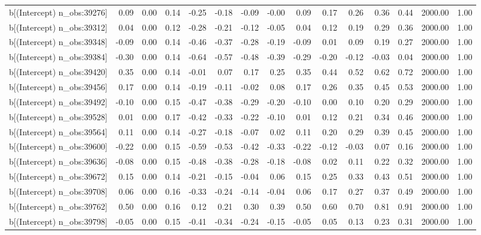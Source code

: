 \begin{table}[ht]
\begin{tabular}{rrrrrrrrrrrrrrr}
  b[(Intercept) n\_obs:39276] & 0.09 & 0.00 & 0.14 & -0.25 & -0.18 & -0.09 & -0.00 & 0.09 & 0.17 & 0.26 & 0.36 & 0.44 & 2000.00 & 1.00 \\ 
  b[(Intercept) n\_obs:39312] & 0.04 & 0.00 & 0.12 & -0.28 & -0.21 & -0.12 & -0.05 & 0.04 & 0.12 & 0.19 & 0.29 & 0.36 & 2000.00 & 1.00 \\ 
  b[(Intercept) n\_obs:39348] & -0.09 & 0.00 & 0.14 & -0.46 & -0.37 & -0.28 & -0.19 & -0.09 & 0.01 & 0.09 & 0.19 & 0.27 & 2000.00 & 1.00 \\ 
  b[(Intercept) n\_obs:39384] & -0.30 & 0.00 & 0.14 & -0.64 & -0.57 & -0.48 & -0.39 & -0.29 & -0.20 & -0.12 & -0.03 & 0.04 & 2000.00 & 1.00 \\ 
  b[(Intercept) n\_obs:39420] & 0.35 & 0.00 & 0.14 & -0.01 & 0.07 & 0.17 & 0.25 & 0.35 & 0.44 & 0.52 & 0.62 & 0.72 & 2000.00 & 1.00 \\ 
  b[(Intercept) n\_obs:39456] & 0.17 & 0.00 & 0.14 & -0.19 & -0.11 & -0.02 & 0.08 & 0.17 & 0.26 & 0.35 & 0.45 & 0.53 & 2000.00 & 1.00 \\ 
  b[(Intercept) n\_obs:39492] & -0.10 & 0.00 & 0.15 & -0.47 & -0.38 & -0.29 & -0.20 & -0.10 & 0.00 & 0.10 & 0.20 & 0.29 & 2000.00 & 1.00 \\ 
  b[(Intercept) n\_obs:39528] & 0.01 & 0.00 & 0.17 & -0.42 & -0.33 & -0.22 & -0.10 & 0.01 & 0.12 & 0.21 & 0.34 & 0.46 & 2000.00 & 1.00 \\ 
  b[(Intercept) n\_obs:39564] & 0.11 & 0.00 & 0.14 & -0.27 & -0.18 & -0.07 & 0.02 & 0.11 & 0.20 & 0.29 & 0.39 & 0.45 & 2000.00 & 1.00 \\ 
  b[(Intercept) n\_obs:39600] & -0.22 & 0.00 & 0.15 & -0.59 & -0.53 & -0.42 & -0.33 & -0.22 & -0.12 & -0.03 & 0.07 & 0.16 & 2000.00 & 1.00 \\ 
  b[(Intercept) n\_obs:39636] & -0.08 & 0.00 & 0.15 & -0.48 & -0.38 & -0.28 & -0.18 & -0.08 & 0.02 & 0.11 & 0.22 & 0.32 & 2000.00 & 1.00 \\ 
  b[(Intercept) n\_obs:39672] & 0.15 & 0.00 & 0.14 & -0.21 & -0.15 & -0.04 & 0.06 & 0.15 & 0.25 & 0.33 & 0.43 & 0.51 & 2000.00 & 1.00 \\ 
  b[(Intercept) n\_obs:39708] & 0.06 & 0.00 & 0.16 & -0.33 & -0.24 & -0.14 & -0.04 & 0.06 & 0.17 & 0.27 & 0.37 & 0.49 & 2000.00 & 1.00 \\ 
  b[(Intercept) n\_obs:39762] & 0.50 & 0.00 & 0.16 & 0.12 & 0.21 & 0.30 & 0.39 & 0.50 & 0.60 & 0.70 & 0.81 & 0.91 & 2000.00 & 1.00 \\ 
  b[(Intercept) n\_obs:39798] & -0.05 & 0.00 & 0.15 & -0.41 & -0.34 & -0.24 & -0.15 & -0.05 & 0.05 & 0.13 & 0.23 & 0.31 & 2000.00 & 1.00 \\ 

\end{tabular}
\end{table}
